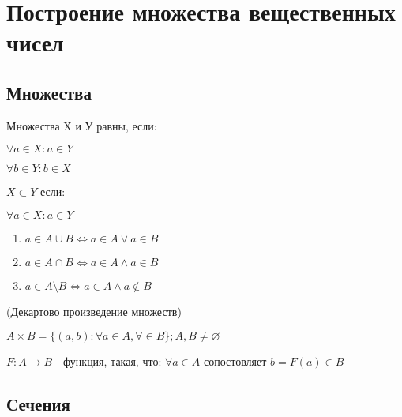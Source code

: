

\chapter{Построение множества вещественных чисел}


\section{Множества}

\begin{definition}
    Множества X и У равны, если:
    
    $\forall a \in X: a \in Y$

    $\forall b \in Y: b \in X$
\end{definition}

\begin{definition}
    $X \subset Y$ если:
    
    $\forall a \in X: a \in Y$
\end{definition}

\begin{definition}
    \begin{enumerate}
        \item $a \in A \cup B \Leftrightarrow a \in A \lor a \in B$
        \item $a \in A \cap B \Leftrightarrow a \in A \land a \in B$
        \item $a \in A \setminus B \Leftrightarrow a \in A \land a \notin B$
    \end{enumerate}
\end{definition}

\begin{definition} (Декартово произведение множеств)
    
    $A \times B = \{(a, b): \forall a \in A, \forall \in B\}; A, B \neq \varnothing$
\end{definition}

\begin{definition}

    $F: A \rightarrow B$ - функция, такая, что: $\forall a \in A$ сопостовляет $b = F(a) \in B$
\end{definition}

\section{Сечения}

